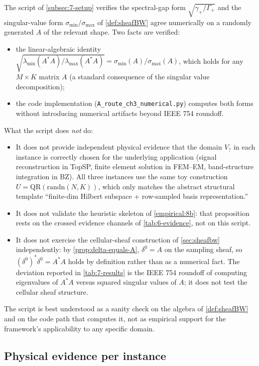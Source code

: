 The script of \cref{subsec:7-setup} verifies the spectral-gap form
$\sqrt{\gamma_+/\Gamma_+}$ and the singular-value form
$\sigma_{\min}/\sigma_{\max}$ of \cref{def:sheafBW} agree numerically
on a randomly generated $A$ of the relevant shape. Two facts are
verified:
\begin{itemize}[leftmargin=*]
\item the linear-algebraic identity
  $\sqrt{\lambda_{\min}(A^* A) / \lambda_{\max}(A^* A)}
  = \sigma_{\min}(A)/\sigma_{\max}(A)$,
  which holds for any $M \times K$ matrix $A$ (a standard consequence
  of the singular value decomposition);
\item the code implementation (\texttt{A\_route\_ch3\_numerical.py})
  computes both forms without introducing numerical artifacts beyond
  IEEE 754 roundoff.
\end{itemize}
What the script does \emph{not} do:
\begin{itemize}[leftmargin=*]
\item It does not provide independent physical evidence that the
  domain $V_?$ in each instance is correctly chosen for the underlying
  application (signal reconstruction in TopSP, finite element solution
  in FEM--EM, band-structure integration in BZ). All three instances
  use the same toy construction
  $U = \mathrm{QR}(\mathrm{randn}(N, K))$, which only matches the
  abstract structural template
  ``finite-dim Hilbert subspace + row-sampled basis representation.''
\item It does not validate the heuristic skeleton of
  \cref{empirical:8b}: that proposition rests on the crossed
  evidence channels of \cref{tab:6-evidence}, not on this script.
\item It does not exercise the cellular-sheaf construction of
  \cref{sec:sheafbw} independently: by \cref{prop:delta-equals-A},
  $\delta^0 = A$ on the sampling sheaf, so
  $(\delta^0)^* \delta^0 = A^* A$ holds by definition rather than as
  a numerical fact. The deviation reported in \cref{tab:7-results}
  is the IEEE 754 roundoff of computing eigenvalues of $A^*A$ versus
  squared singular values of $A$; it does not test the cellular
  sheaf structure.
\end{itemize}
The script is best understood as a sanity check on the algebra of
\cref{def:sheafBW} and on the code path that computes it, not as
empirical support for the framework's applicability to any specific
domain.

\subsection{Physical evidence per instance}\label{subsec:7-evidence}

